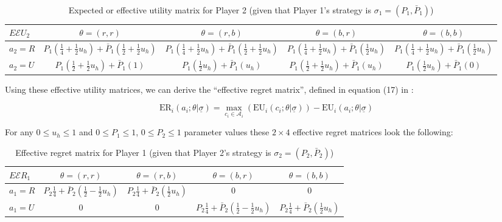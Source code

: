 \documentclass{article}
\theoremstyle{definition}
\begin{document}
\begin{table}[H]
    \label{tab:UtilityGeneralUncertaintyIndividualistic}
\begin{center}
\small
\renewcommand{\arraystretch}{1.3} %
\begin{tabular}{| l|c c c c|}
\hline
\multirow{1}{*}{$E\mathcal{E}U_2$} & $\theta=(r,r)$  & $\theta=(r,b)$ & $\theta=(b,r)$ & $\theta=(b,b)$\\
\hline
  $a_2=R$ &
  $P_1(\frac{1}{4} +  \frac{1}{2} u_h) + \bar{P}_1 (\frac{1}{2} + \frac{1}{2} u_h)$ &
  $P_1(\frac{1}{4} +  \frac{1}{2} u_h) + \bar{P}_1 (\frac{1}{2} + \frac{1}{2} u_h)$ &
  $P_1(\frac{1}{4} +  \frac{1}{2} u_h) + \bar{P}_1 (\frac{1}{2} u_h)$ &
  $P_1(\frac{1}{4} +  \frac{1}{2} u_h) + \bar{P}_1 (\frac{1}{2} u_h)$\\
\cline{1-5}
  $a_2=U$ &
  $P_1(\frac{1}{2} + \frac{1}{2} u_h)+\bar{P}_1(1)$ &
  $P_1(\frac{1}{2} u_h) + \bar{P}_1 (u_h)$ &
  $P_1(\frac{1}{2} + \frac{1}{2} u_h)+\bar{P}_1(u_h)$ &
  $P_1(\frac{1}{2} u_h) + \bar{P}_1 (0)$\\
\hline
\end{tabular}
\caption{Expected or effective utility matrix for Player 2 (given that Player 1's strategy is $\sigma_1=(P_1,\bar{P}_1)$)}
\end{center}
\end{table}

Using these effective utility matrices, we can derive the ``effective regret matrix'', defined in equation (17) in \cite{arxiv:ExtendedEquilibrium}:

    \begin{equation}
    \label{eq:RegretMatrix}
        \mathrm{ER}_i(a_i;\theta | \underline{\sigma}) =
        \max_{c_i \in \mathcal{A}_i} \left ( \mathrm{EU}_i(c_i;\theta | \underline{\sigma}) \right ) - \mathrm{EU}_i(a_i;\theta | \underline{\sigma})
    \end{equation}

For any $0 \le u_h \le 1$ and $0 \le P_1 \le 1$, $0 \le P_2 \le 1$ parameter values these $2\times4$ effective regret matrices look the following:

\begin{table}[H]
    \label{tab:UtilityGeneralUncertaintyIndividualistic}
\begin{center}
\small
\renewcommand{\arraystretch}{1.3} %
\begin{tabular}{| l|c c c c|}
\hline
\multirow{1}{*}{$E\mathcal{E}R_1$} & $\theta=(r,r)$  & $\theta=(r,b)$ & $\theta=(b,r)$ & $\theta=(b,b)$\\
\hline
  $a_1=R$ &
  $P_2\frac{1}{4} + \bar{P}_2 (\frac{1}{2} - \frac{1}{2} u_h)$ &
  $P_2\frac{1}{4} + \bar{P}_2 (\frac{1}{2} u_h)$ &
  $0$ &
  $0$\\
\cline{1-5}
  $a_1=U$ &
  $0$ &
  $0$ &
  $P_2\frac{1}{4} + \bar{P}_2 (\frac{1}{2}-\frac{1}{2}u_h)$ &
  $P_2\frac{1}{4} + \bar{P}_2 (\frac{1}{2} u_h)$\\
\hline
\end{tabular}
\caption{Effective regret matrix for Player 1 (given that Player 2's strategy is $\sigma_2=(P_2,\bar{P}_2)$)}
\end{center}
\end{table}
\end{document}
